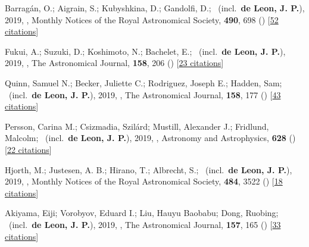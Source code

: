 \item[{\color{numcolor}\scriptsize17}] Barrag{\'a}n, O.; Aigrain, S.; Kubyshkina, D.; Gandolfi, D.; \etal\ (incl.\ \textbf{de Leon, J. P.}), 2019, , Monthly Notices of the Royal Astronomical Society, \textbf{490}, 698 () [\href{https://ui.adsabs.harvard.edu/abs/2019MNRAS.490..698B}{52 citations}]

\item[{\color{numcolor}\scriptsize16}] Fukui, A.; Suzuki, D.; Koshimoto, N.; Bachelet, E.; \etal\ (incl.\ \textbf{de Leon, J. P.}), 2019, , The Astronomical Journal, \textbf{158}, 206 () [\href{https://ui.adsabs.harvard.edu/abs/2019AJ....158..206F}{23 citations}]

\item[{\color{numcolor}\scriptsize15}] Quinn, Samuel N.; Becker, Juliette C.; Rodriguez, Joseph E.; Hadden, Sam; \etal\ (incl.\ \textbf{de Leon, J. P.}), 2019, , The Astronomical Journal, \textbf{158}, 177 () [\href{https://ui.adsabs.harvard.edu/abs/2019AJ....158..177Q}{43 citations}]

\item[{\color{numcolor}\scriptsize14}] Persson, Carina M.; Csizmadia, Szil{\'a}rd; Mustill, Alexander J.; Fridlund, Malcolm; \etal\ (incl.\ \textbf{de Leon, J. P.}), 2019, , Astronomy and Astrophysics, \textbf{628} () [\href{https://ui.adsabs.harvard.edu/abs/2019A&A...628A..64P}{22 citations}]

\item[{\color{numcolor}\scriptsize13}] Hjorth, M.; Justesen, A. B.; Hirano, T.; Albrecht, S.; \etal\ (incl.\ \textbf{de Leon, J. P.}), 2019, , Monthly Notices of the Royal Astronomical Society, \textbf{484}, 3522 () [\href{https://ui.adsabs.harvard.edu/abs/2019MNRAS.484.3522H}{18 citations}]

\item[{\color{numcolor}\scriptsize12}] Akiyama, Eiji; Vorobyov, Eduard I.; Liu, Hauyu Baobabu; Dong, Ruobing; \etal\ (incl.\ \textbf{de Leon, J. P.}), 2019, , The Astronomical Journal, \textbf{157}, 165 () [\href{https://ui.adsabs.harvard.edu/abs/2019AJ....157..165A}{33 citations}]

